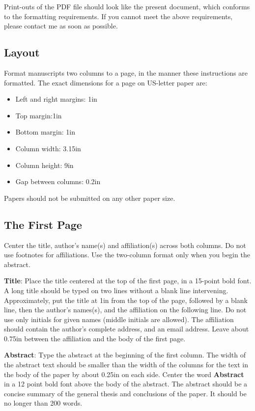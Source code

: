 \documentclass[11pt]{article}
\begin{document}
Print-outs of the PDF file should look like the present document,
which conforms to the formatting requirements. If you cannot meet the
above requirements, please contact me as soon as possible.

\subsection{Layout}
\label{ssec:layout}

Format manuscripts two columns to a page, in the manner these
instructions are formatted. The exact dimensions for a page on US-letter
paper are:

\begin{itemize}
\item Left and right margins: 1in
\item Top margin:1in
\item Bottom margin: 1in
\item Column width: 3.15in
\item Column height: 9in
\item Gap between columns: 0.2in
\end{itemize}

Papers should not be submitted on any other paper size. 

\subsection{The First Page}
\label{ssec:first}

Center the title, author's name(s) and affiliation(s) across both
columns. Do not use footnotes for affiliations.  Use the two-column
format only when you begin the abstract.

{\bf Title}: Place the title centered at the top of the first page, in
a 15-point bold font. A long title should be typed on two lines
without a blank line intervening. Approximately, put the title at 1in
from the top of the page, followed by a blank line, then the author's
names(s), and the affiliation on the following line.  Do not use only
initials for given names (middle initials are allowed). The
affiliation should contain the author's complete address, and an email
address. Leave about 0.75in between the affiliation and the body of
the first page.

{\bf Abstract}: Type the abstract at the beginning of the first
column.  The width of the abstract text should be smaller than the
width of the columns for the text in the body of the paper by about
0.25in on each side.  Center the word {\bf Abstract} in a 12 point
bold font above the body of the abstract. The abstract should be a
concise summary of the general thesis and conclusions of the paper.
It should be no longer than 200 words.
\end{document}
